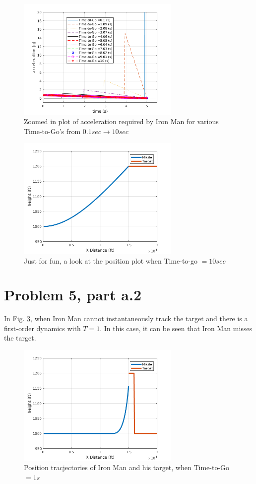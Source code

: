 \documentclass[paper=a4, fontsize=11pt]{scrartcl}
\numberwithin{equation}{section}		%
\numberwithin{figure}{section}			%
\numberwithin{table}{section}				%
\begin{document}
\begin{figure}[!htb]
	\centering
	\includegraphics[width=0.7\textwidth]{fivec2}
	\caption{ Zoomed in plot of acceleration required by Iron Man for various Time-to-Go's from $0.1sec \rightarrow 10sec$\label{fig:f4}}
\end{figure}

\begin{figure}[!htb]
	\centering
	\includegraphics[width=0.7\textwidth]{fivec3}
	\caption{ Just for fun, a look at the position plot when Time-to-go $=10sec$\label{fig:f5}}
\end{figure}

\section*{Problem 5, part a.2}
In Fig. \ref{fig:f6}, when Iron Man cannot instantaneously track the target and there is a first-order dynamics with $T=1$. In this case, it can be seen that Iron Man misses the target. 
\begin{figure}[!htb]
	\centering
	\includegraphics[width=0.7\textwidth]{fivea2}
	\caption{ Position tracjectories of Iron Man and his target, when Time-to-Go $= 1s$ \label{fig:f6}}
\end{figure}
\end{document}
